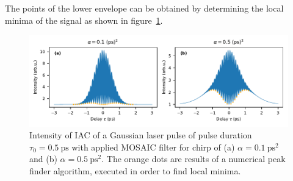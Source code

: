 \newpage

The points of the lower envelope can be obtained by determining the local minima of the signal as shown in figure~\ref{fig:mosaicchirpedlaserpulsefindenvelope}.

\begin{figure}[H]
	\centering
	\includegraphics[width=\linewidth]{figures/chirp/plots/mosaic_chirped_laser_pulse_find_envelope}
	\caption{Intensity of IAC of a Gaussian laser pulse of pulse duration $\tau_0=\SI{0.5}{\pico \second}$ with applied MOSAIC filter for chirp of (a) $\alpha = \SI{0.1}{\pico \second \squared}$ and (b) $\alpha = \SI{0.5}{\pico \second \squared}$.
		The orange dots are results of a numerical peak finder algorithm, executed in order to find local minima.}
	\label{fig:mosaicchirpedlaserpulsefindenvelope}
\end{figure}

